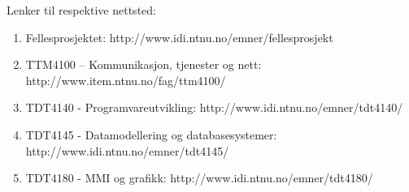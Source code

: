 Lenker til respektive nettsted:
\begin{enumerate}
\item Fellesprosjektet: http://www.idi.ntnu.no/emner/fellesprosjekt

\item TTM4100 – Kommunikasjon, tjenester og nett: http://www.item.ntnu.no/fag/ttm4100/ 

\item TDT4140 - Programvareutvikling: http://www.idi.ntnu.no/emner/tdt4140/

\item TDT4145 - Datamodellering og databasesystemer: http://www.idi.ntnu.no/emner/tdt4145/

\item TDT4180 - MMI og grafikk: http://www.idi.ntnu.no/emner/tdt4180/
\end{enumerate}
